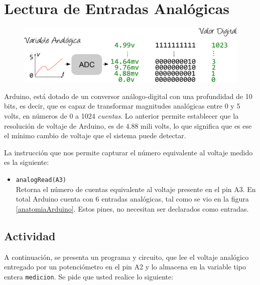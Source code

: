 \documentclass[letterpaper, 10pt]{report}
\begin{document}
\section{Lectura de Entradas Analógicas}

\begin{figure}[h]
\centering
\includegraphics[scale=0.6]{adc.png}
\end{figure}

Arduino, está dotado de un conversor análogo-digital con una profundidad de 10 bits, es decir, que es capaz de transformar magnitudes analógicas entre 0 y 5 volts, en números de 0 a 1024 \emph{cuentas}. Lo anterior permite establecer que la resolución de voltaje de Arduino, es de 4.88 mili volts, lo que significa que es ese el mínimo cambio de voltaje que el sistema puede detectar.

La instrucción que nos permite capturar el número equivalente al voltaje medido es la siguiente:

\begin{itemize}
	\item \texttt{analogRead(A3)}\\
	Retorna el número de cuentas equivalente al voltaje presente en el pin A3. En total Arduino cuenta con 6 entradas analógicas, tal como se vio en la figura \ref{anatomiaArduino}. Estos pines, no necesitan ser declarados como entradas.
\end{itemize}

\subsection{Actividad}

A continuación, se presenta un programa y circuito, que lee el voltaje analógico entregado por un potenciómetro en el pin A2 y lo almacena en la variable tipo entera \texttt{medicion}. Se pide que usted realice lo siguiente:
\end{document}
